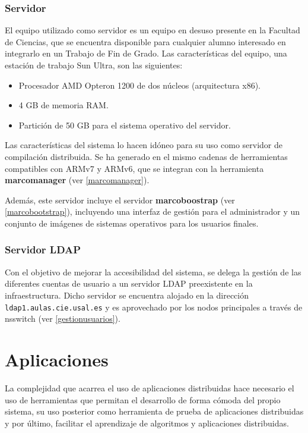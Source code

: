 \subsubsection{Servidor}
\label{servidor}
El equipo utilizado como servidor es un equipo en desuso presente en la Facultad de Ciencias, que se encuentra disponible para cualquier alumno interesado en integrarlo en un Trabajo de Fin de Grado. Las características del equipo, una estación de trabajo Sun Ultra, son las siguientes:

\begin{itemize}
	\item Procesador AMD Opteron 1200 de dos núcleos (arquitectura x86).
	\item 4 GB de memoria RAM.
	\item Partición de 50 GB para el sistema operativo del servidor.
\end{itemize}

Las características del sistema lo hacen idóneo para su uso como servidor de compilación distribuida. Se ha generado en el mismo cadenas de herramientas compatibles con ARMv7 y ARMv6, que se integran con la herramienta \textbf{marcomanager} (ver \ref{marcomanager}).

Además, este servidor incluye el servidor \textbf{marcoboostrap} (ver \ref{marcobootstrap}), incluyendo una interfaz de gestión para el administrador y un conjunto de imágenes de sistemas operativos para los usuarios finales.

\subsubsection{Servidor LDAP}

Con el objetivo de mejorar la accesibilidad del sistema, se delega la gestión de las diferentes cuentas de usuario a un servidor LDAP preexistente en la infraestructura. Dicho servidor se encuentra alojado en la dirección \texttt{ldap1.aulas.cie.usal.es} y es aprovechado por los nodos principales a través de nsswitch (ver \ref{gestionusuarios}).


\section{Aplicaciones}

La complejidad que acarrea el uso de aplicaciones distribuidas hace necesario el uso de herramientas que permitan el desarrollo de forma cómoda del propio sistema, su uso posterior como herramienta de prueba de aplicaciones distribuidas y por último, facilitar el aprendizaje de algoritmos y aplicaciones distribuidas.

